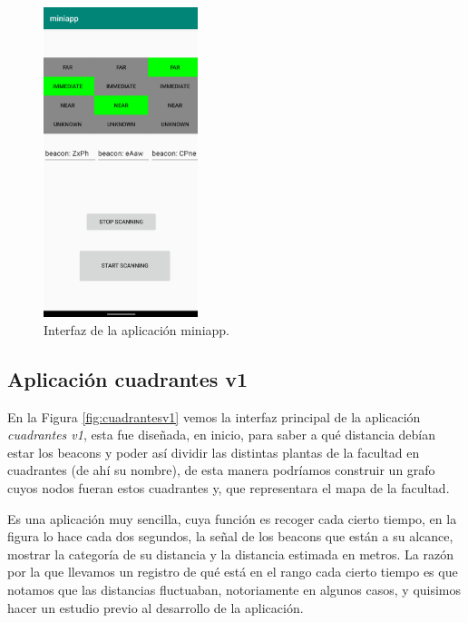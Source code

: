 \begin{figure}[t]
	\centering
	\includegraphics[width=0.4\textwidth]{Imagenes/Descripciondeltrabajo/miniapp}
	\caption{Interfaz de la aplicación miniapp. }
	\label{fig:miniapp}
\end{figure}

\subsection{Aplicación cuadrantes v1}
En la Figura \ref{fig:cuadrantesv1} vemos la interfaz principal de la aplicación \textit{cuadrantes v1}, esta fue diseñada, en inicio, para saber a qué distancia debían estar los beacons y poder así dividir las distintas plantas de la facultad en cuadrantes (de ahí su nombre), de esta manera podríamos construir un grafo cuyos nodos fueran estos cuadrantes y, que representara el mapa de la facultad.

Es una aplicación muy sencilla, cuya función es recoger cada cierto tiempo, en la figura lo hace cada dos segundos, la señal de los beacons que están a su alcance, mostrar la categoría de su distancia y la distancia estimada en metros. La razón por la que llevamos un registro de qué está en el rango cada cierto tiempo es que notamos que las distancias fluctuaban, notoriamente en algunos casos, y quisimos hacer un estudio previo al desarrollo de la aplicación.


